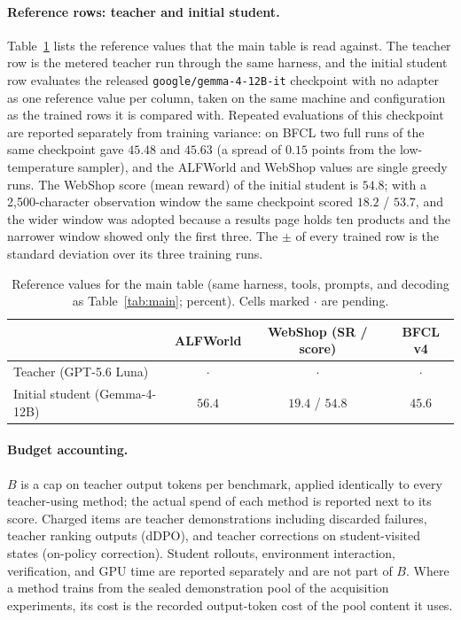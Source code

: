 \paragraph{Reference rows: teacher and initial student.}
Table~\ref{tab:reference} lists the reference values that the main
table is read against. The teacher row is the metered teacher run
through the same harness, and the initial student row evaluates the
released \texttt{google/gemma-4-12B-it} checkpoint with no adapter as
one reference value per column, taken on the same machine and
configuration as the trained rows it is compared with. Repeated
evaluations of this checkpoint are reported separately from training
variance: on BFCL two full runs of the same checkpoint gave $45.48$
and $45.63$ (a spread of $0.15$ points from the low-temperature
sampler), and the ALFWorld and WebShop values are single greedy runs.
The WebShop score (mean reward) of the initial student is $54.8$; with a 2{,}500-character observation window the same checkpoint scored $18.2$ / $53.7$, and the wider window was adopted because a results page holds ten products and the narrower window showed only the first three. The
$\pm$ of every trained row is the standard deviation over its three
training runs.

\begin{table}[h]
\centering
\caption{Reference values for the main table (same harness, tools,
prompts, and decoding as Table~\ref{tab:main}; percent). Cells marked
$\cdot$ are pending.}
\label{tab:reference}
\small
\begin{tabular}{lccc}
\toprule
 & ALFWorld & WebShop (SR / score) & BFCL v4\\
\midrule
Teacher (GPT-5.6 Luna) & $\cdot$ & $\cdot$ & $\cdot$\\
Initial student (Gemma-4-12B) & $56.4$ & $19.4$ / $54.8$ & $45.6$\\
\bottomrule
\end{tabular}
\end{table}

\paragraph{Budget accounting.}
$B$ is a cap on teacher output tokens per benchmark, applied
identically to every teacher-using method; the actual spend of each
method is reported next to its score. Charged items are teacher
demonstrations including discarded failures, teacher ranking outputs
(dDPO), and teacher corrections on student-visited states (on-policy
correction). Student rollouts, environment interaction, verification,
and GPU time are reported separately and are not part of $B$. Where a
method trains from the sealed demonstration pool of the acquisition
experiments, its cost is the recorded output-token cost of the pool
content it uses.


